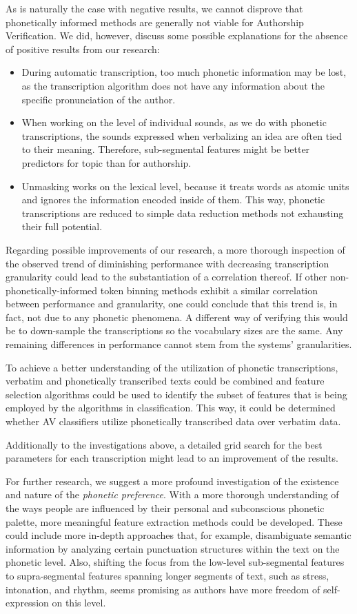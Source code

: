 As is naturally the case with negative results, we cannot disprove that phonetically informed methods are generally not viable for Authorship Verification.
We did, however, discuss some possible explanations for the absence of positive results from our research:
\begin{itemize}
    \item During automatic transcription, too much phonetic information may be lost, as the transcription algorithm does not have any information about the specific pronunciation of the author.
    \item When working on the level of individual sounds, as we do with phonetic transcriptions, the sounds expressed when verbalizing an idea are often tied to their meaning. Therefore, sub-segmental features might be better predictors for topic than for authorship.
    \item Unmasking works on the lexical level, because it treats words as atomic units and ignores the information encoded inside of them. This way, phonetic transcriptions are reduced to simple data reduction methods not exhausting their full potential.
\end{itemize}
Regarding possible improvements of our research, a more thorough inspection of the observed trend of diminishing performance with decreasing transcription granularity could lead to the substantiation of a correlation thereof.
If other non-phonetically-informed token binning methods exhibit a similar correlation between performance and granularity, one could conclude that this trend is, in fact, not due to any phonetic phenomena.
A different way of verifying this would be to down-sample the transcriptions so the vocabulary sizes are the same.
Any remaining differences in performance cannot stem from the systems' granularities.

To achieve a better understanding of the utilization of phonetic transcriptions, verbatim and phonetically transcribed texts could be combined and feature selection algorithms could be used to identify the subset of features that is being employed by the algorithms in classification.
This way, it could be determined whether AV classifiers utilize phonetically transcribed data over verbatim data.

Additionally to the investigations above, a detailed grid search for the best parameters for each transcription might lead to an improvement of the results.

For further research, we suggest a more profound investigation of the existence and nature of the \textit{phonetic preference}.
With a more thorough understanding of the ways people are influenced by their personal and subconscious phonetic palette, more meaningful feature extraction methods could be developed.
These could include more in-depth approaches that, for example, disambiguate semantic information by analyzing certain punctuation structures within the text on the phonetic level.
Also, shifting the focus from the low-level sub-segmental features to supra-segmental features spanning longer segments of text, such as stress, intonation, and rhythm, seems promising as authors have more freedom of self-expression on this level.